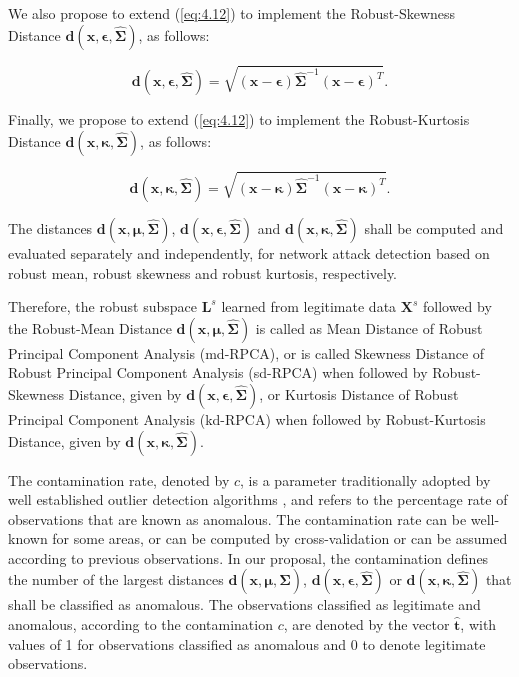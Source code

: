 \documentclass[review]{elsarticle}
\begin{document}
We also propose to extend (\ref{eq:4.12}) to implement the Robust-Skewness Distance $\pmb{d}(\pmb{x}, \pmb{\epsilon}, \hat{\pmb{\Sigma}})$, as follows:

\begin{equation}\label{eq:4.13}
	\pmb{d}(\pmb{x}, \pmb{\epsilon}, \hat{\pmb{\Sigma}}) = \sqrt{(\pmb{x} - \pmb{\epsilon}) \hat{\pmb{\Sigma}}^{-1}(\pmb{x} - \pmb{\epsilon})^T}.
\end{equation}

Finally, we propose to extend (\ref{eq:4.12}) to implement the Robust-Kurtosis Distance $\pmb{d}(\pmb{x}, \pmb{\kappa}, \hat{\pmb{\Sigma}})$, as follows:

\begin{equation}\label{eq:4.14}
	\pmb{d}(\pmb{x}, \pmb{\kappa}, \hat{\pmb{\Sigma}}) = \sqrt{(\pmb{x} - \pmb{\kappa}) \hat{\pmb{\Sigma}}^{-1}(\pmb{x} - \pmb{\kappa})^T}.
\end{equation}

The distances $\pmb{d}(\pmb{x}, \pmb{\mu}, \hat{\pmb{\Sigma}})$, $\pmb{d}(\pmb{x}, \pmb{\epsilon}, \hat{\pmb{\Sigma}})$ and $\pmb{d}(\pmb{x}, \pmb{\kappa}, \hat{\pmb{\Sigma}})$ shall be computed and evaluated separately and independently, for network attack detection based on robust mean, robust skewness and robust kurtosis, respectively. 

Therefore, the robust subspace $\pmb{L}^s$ learned from legitimate data $\pmb{X}^s$ followed by the Robust-Mean Distance $\pmb{d}(\pmb{x}, \pmb{\mu}, \hat{\pmb{\Sigma}})$ is called as Mean Distance of Robust Principal Component Analysis (md-RPCA), or is called Skewness Distance of Robust Principal Component Analysis (sd-RPCA) when followed by Robust-Skewness Distance, given by $\pmb{d}(\pmb{x}, \pmb{\epsilon}, \hat{\pmb{\Sigma}})$, or Kurtosis Distance of Robust Principal Component Analysis (kd-RPCA) when followed by Robust-Kurtosis Distance, given by $\pmb{d}(\pmb{x}, \pmb{\kappa}, \hat{\pmb{\Sigma}})$.

The contamination rate, denoted by $c$, is a parameter traditionally adopted by well established outlier detection algorithms \cite{zhao2019pyod}, and refers to the percentage rate of observations that are known as anomalous. The contamination rate can be well-known for some areas, or can be computed by cross-validation \cite{arlot2010survey} or can be assumed according to previous observations. In our proposal, the contamination defines the number of the largest distances $\pmb{d}(\pmb{x}, \pmb{\mu}, \hat{\pmb{\Sigma}})$, $\pmb{d}(\pmb{x}, \pmb{\epsilon}, \hat{\pmb{\Sigma}})$ or $\pmb{d}(\pmb{x}, \pmb{\kappa}, \hat{\pmb{\Sigma}})$ that shall be classified as anomalous. The observations classified as legitimate and anomalous, according to the contamination $c$, are denoted by the vector $\hat{\pmb{t}}$, with values of 1 for observations classified as anomalous and 0 to denote legitimate observations.
\end{document}
